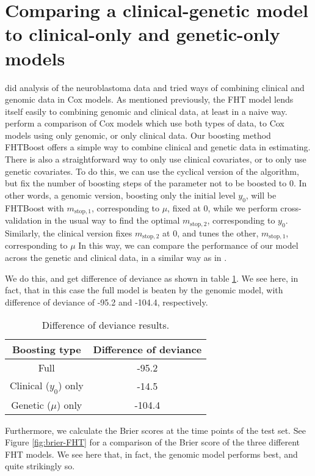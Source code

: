 \section{Comparing a clinical-genetic model to clinical-only and genetic-only models}
\citet{bovelstad2009} did analysis of the neuroblastoma data and tried ways of combining clinical and genomic data in Cox models.
As mentioned previously, the FHT model lends itself easily to combining genomic and clinical data, at least in a naive way.
\citet{bovelstad2009} perform a comparison of Cox models which use both types of data, to Cox models using only genomic, or only clinical data.
Our boosting method FHTBoost offers a simple way to combine clinical and genetic data in estimating.
There is also a straightforward way to only use clinical covariates, or to only use genetic covariates.
To do this, we can use the cyclical version of the algorithm, but fix the number of boosting steps of the parameter not to be boosted to 0.
In other words, a genomic version, boosting only the initial level $y_0$, will be FHTBoost with $m_{\text{stop},1}$, corresponding to $\mu$, fixed at 0, while we perform cross-validation in the usual way to find the optimal $m_{\text{stop},2}$, corresponding to $y_0$.
Similarly, the clinical version fixes $m_{\text{stop},2}$ at 0, and tunes the other, $m_{\text{stop},1}$, corresponding to $\mu$
In this way, we can compare the performance of our model across the genetic and clinical data, in a similar way as in \citet{bovelstad2009}.

We do this, and get difference of deviance as shown in table \ref{tab:deviances}.
We see here, in fact, that in this case the full model is beaten by the genomic model, with difference of deviance of -95.2 and -104.4, respectively.

\begin{table}
\caption{Difference of deviance results.}
\label{tab:deviances}
\centering
\begin{tabular}{cc}
\toprule
Boosting type & Difference of deviance \\
\hline
Full & -95.2 \\
Clinical ($y_0$) only  & -14.5 \\
Genetic ($\mu$) only & -104.4 \\
\bottomrule
\end{tabular}
\end{table}

Furthermore, we calculate the Brier scores at the time points of the test set.
See Figure \ref{fig:brier-FHT} for a comparison of the Brier score of the three different FHT models.
We see here that, in fact, the genomic model performs best, and quite strikingly so.

